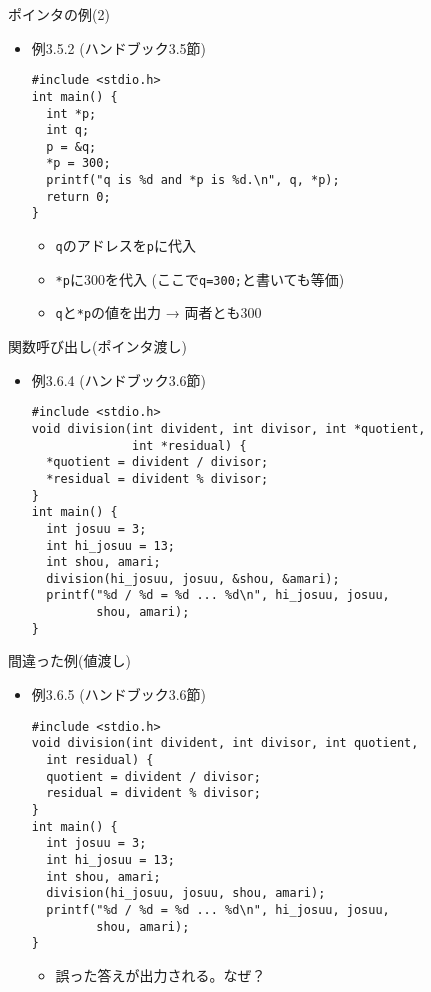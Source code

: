 \begin{frame}[t,fragile]{ポインタの例(2)}
  \begin{itemize}
    \setlength{\itemsep}{1em}
  \item 例3.5.2 (ハンドブック3.5節)
\begin{lstlisting}
#include <stdio.h>
int main() {
  int *p;
  int q;
  p = &q;
  *p = 300;
  printf("q is %d and *p is %d.\n", q, *p);
  return 0;
}
\end{lstlisting}
\begin{itemize}
\item \verb+q+のアドレスを\verb+p+に代入
\item \verb+*p+に300を代入 (ここで\verb+q=300;+と書いても等価)
\item \verb+q+と\verb+*p+の値を出力 → 両者とも300
\end{itemize}
  \end{itemize}
\end{frame}

\begin{frame}[t,fragile]{関数呼び出し(ポインタ渡し)}
  \begin{itemize}
    \setlength{\itemsep}{1em}
  \item 例3.6.4 (ハンドブック3.6節)
\begin{lstlisting}
#include <stdio.h>
void division(int divident, int divisor, int *quotient,
              int *residual) {
  *quotient = divident / divisor;
  *residual = divident % divisor;
}
int main() {
  int josuu = 3;
  int hi_josuu = 13;
  int shou, amari;
  division(hi_josuu, josuu, &shou, &amari);
  printf("%d / %d = %d ... %d\n", hi_josuu, josuu,
         shou, amari);
}
\end{lstlisting}
  \end{itemize}
\end{frame}

\begin{frame}[t,fragile]{間違った例(値渡し)}
  \begin{itemize}
    \setlength{\itemsep}{1em}
  \item 例3.6.5 (ハンドブック3.6節)
\begin{lstlisting}
#include <stdio.h>
void division(int divident, int divisor, int quotient,
  int residual) {
  quotient = divident / divisor;
  residual = divident % divisor;
}
int main() {
  int josuu = 3;
  int hi_josuu = 13;
  int shou, amari;
  division(hi_josuu, josuu, shou, amari);
  printf("%d / %d = %d ... %d\n", hi_josuu, josuu,
         shou, amari);
}
\end{lstlisting}
\begin{itemize}
\item 誤った答えが出力される。なぜ？
\end{itemize}
  \end{itemize}
\end{frame}

